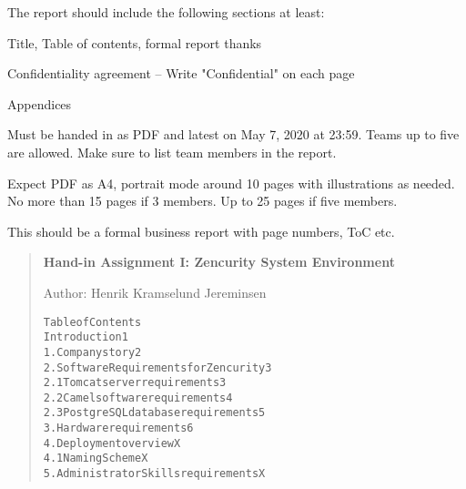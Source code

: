 \documentclass[Screen16to9,17pt]{foils}
\begin{document}

The report should include the following sections at least:
\begin{list2}
\item Title, Table of contents, formal report thanks
\item Confidentiality agreement -- Write "Confidential" on each page
\item Appendices
\end{list2}

Must be handed in as PDF and latest on May 7, 2020 at 23:59. Teams up to five are allowed. Make sure to list team members in the report.

Expect PDF as A4, portrait mode around 10 pages with illustrations as needed.
No more than 15 pages if 3 members. Up to 25 pages if five members.

This should be a formal business report with page numbers, ToC etc.


\begin{quote}{\bf\large
Hand-in Assignment I:
Zencurity System Environment}

Author: Henrik Kramselund Jereminsen
\begin{alltt}
  Table of Contents
  Introduction                               1
  1. Company story                           2
  2. Software Requirements for Zencurity     3
  2.1 Tomcat server requirements             3
  2.2 Camel software requirements            4
  2.3 PostgreSQL database requirements       5
  3. Hardware requirements                   6
  4. Deployment overview                     X
  4.1 Naming Scheme                          X
  5. Administrator Skills requirements       X
\end{alltt}
\end{quote}








\slidenext
\end{document}

